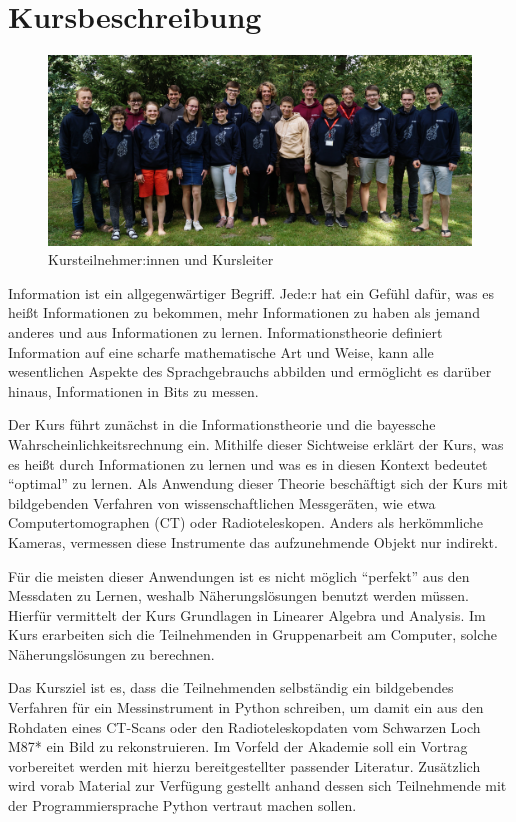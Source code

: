 \section*{Kursbeschreibung}

\begin{figure}
    \centering
    \includegraphics[width=\textwidth]{k4.2/kursfoto.jpg}
    \caption{Kursteilnehmer:innen und Kursleiter}
\end{figure}

Information ist ein allgegenwärtiger Begriff. Jede:r hat ein Gefühl dafür, was es heißt Informationen zu bekommen, mehr Informationen zu haben als jemand anderes und aus Informationen zu lernen.
Informationstheorie definiert Information auf eine scharfe mathematische Art und Weise, kann alle wesentlichen Aspekte des Sprachgebrauchs abbilden und ermöglicht es darüber hinaus, Informationen in Bits zu messen.

Der Kurs führt zunächst in die Informationstheorie und die bayessche Wahrscheinlichkeitsrechnung ein.
Mithilfe dieser Sichtweise erklärt der Kurs, was es heißt durch Informationen zu lernen und was es in diesen Kontext bedeutet \enquote{optimal} zu lernen.
Als Anwendung dieser Theorie beschäftigt sich der Kurs mit bildgebenden Verfahren von wissenschaftlichen Messgeräten, wie etwa Computertomographen (CT) oder Radioteleskopen.
Anders als herkömmliche Kameras, vermessen diese Instrumente das aufzunehmende Objekt nur indirekt.

Für die meisten dieser Anwendungen ist es nicht möglich \enquote{perfekt} aus den Messdaten zu Lernen, weshalb Näherungslösungen benutzt werden müssen.
Hierfür vermittelt der Kurs Grundlagen in Linearer Algebra und Analysis.
Im Kurs erarbeiten sich die Teilnehmenden in Gruppenarbeit am Computer, solche Näherungslösungen zu berechnen.

Das Kursziel ist es, dass die Teilnehmenden selbständig ein bildgebendes Verfahren für ein Messinstrument in Python schreiben, um damit ein aus den Rohdaten eines CT-Scans oder den Radioteleskopdaten vom Schwarzen Loch M87* ein Bild zu rekonstruieren.
Im Vorfeld der Akademie soll ein Vortrag vorbereitet werden mit hierzu bereitgestellter passender Literatur.
Zusätzlich wird vorab Material zur Verfügung gestellt anhand dessen sich Teilnehmende mit der Programmiersprache Python vertraut machen sollen.


